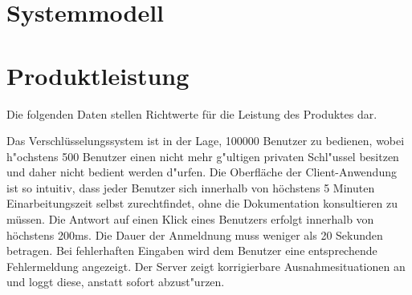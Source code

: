 \documentclass[a4paper,10pt]{scrartcl}
\begin{document}
\section{Systemmodell}





\section{Produktleistung}
Die folgenden Daten stellen Richtwerte für die Leistung des Produktes dar.
\begin{usecase}
 {Das Verschlüsselungssystem ist in der Lage, 100000 Benutzer zu bedienen,
                wobei h"ochstens 500 Benutzer einen nicht mehr g"ultigen privaten Schl"ussel
                besitzen und daher nicht bedient werden d"urfen.}
 {Die Oberfläche der Client-Anwendung ist so intuitiv, dass jeder Benutzer
                sich innerhalb von höchstens 5 Minuten Einarbeitungszeit selbst
                zurechtfindet, ohne die Dokumentation konsultieren zu müssen.}
 {Die Antwort auf einen Klick eines Benutzers erfolgt innerhalb von
                höchstens 200ms.}
 {Die Dauer der Anmeldnung muss weniger als 20 Sekunden betragen.}
 {Bei fehlerhaften Eingaben wird dem Benutzer eine entsprechende
                Fehlermeldung angezeigt.}
 {Der Server zeigt korrigierbare Ausnahmesituationen an und loggt diese,
                anstatt sofort abzust"urzen.}
\end{usecase}
\end{document}
